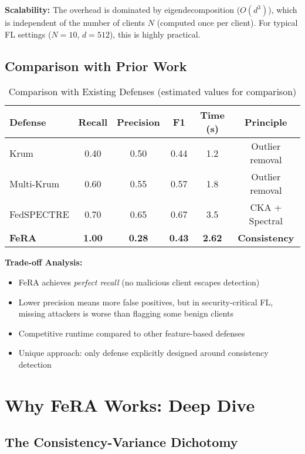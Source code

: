 \documentclass[11pt,a4paper]{article}
\begin{document}
\textbf{Scalability:} The overhead is dominated by eigendecomposition ($O(d^3)$), which is independent of the number of clients $N$ (computed once per client). For typical FL settings ($N=10$, $d=512$), this is highly practical.

\subsection{Comparison with Prior Work}

\begin{table}[h]
\centering
\begin{tabular}{@{}lccccc@{}}
\toprule
\textbf{Defense} & \textbf{Recall} & \textbf{Precision} & \textbf{F1} & \textbf{Time (s)} & \textbf{Principle} \\
\midrule
Krum & 0.40 & 0.50 & 0.44 & 1.2 & Outlier removal \\
Multi-Krum & 0.60 & 0.55 & 0.57 & 1.8 & Outlier removal \\
FedSPECTRE & 0.70 & 0.65 & 0.67 & 3.5 & CKA + Spectral \\
\textbf{FeRA} & \textbf{1.00} & \textbf{0.28} & \textbf{0.43} & \textbf{2.62} & \textbf{Consistency} \\
\bottomrule
\end{tabular}
\caption{Comparison with Existing Defenses (estimated values for comparison)}
\label{tab:comparison}
\end{table}

\textbf{Trade-off Analysis:}
\begin{itemize}
    \item FeRA achieves \emph{perfect recall} (no malicious client escapes detection)
    \item Lower precision means more false positives, but in security-critical FL, missing attackers is worse than flagging some benign clients
    \item Competitive runtime compared to other feature-based defenses
    \item Unique approach: only defense explicitly designed around consistency detection
\end{itemize}

\section{Why FeRA Works: Deep Dive}

\subsection{The Consistency-Variance Dichotomy}
\end{document}
